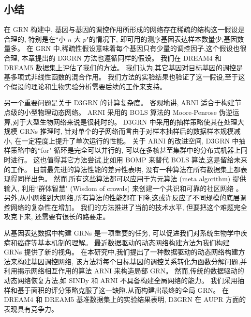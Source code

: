 \subsection{小结}

在 GRN 构建中, 基因与基因的调控作用所形成的网络存在稀疏的结构这一假设是合理的,
特别是在``小 $n$ 大 $p$"的情况下, 即可用的测序基因表达样本数量少,基因数量多。
在 GRN 中,稀疏性假设意味着每个基因只有少量的调控因子,这个假设也很合理,
本章提出的 D3GRN 方法也遵循同样的假设。
我们在 DREAM4 和 DREAM5 数据集上评估了我们的方法。
我们认为,其它基因对目标基因的调控是基多项式非线性函数的混合作用。
我们方法的实验结果也验证了这一假设,至于这个假设的理论和生物实验分析需要后续的工作来支持。

另一个重要问题是关于 D3GRN 的计算复杂度。
客观地讲, ARNI 适合于构建节点级的小型物理动态网络。
ARNI 采用的 BOLS 算法的 Moore-Penrose 伪逆运算,对于大型生物网络来说是很耗时的。
D3GRN 中采用的抽样策略使其在处理大规模 GRNs 推理时,
针对单个的子网络而言由于对样本抽样后的数据样本规模减小,
在一定程度上提升了单次运行的性能。
关于 ARNI 的改进空间, D3GRN 中抽样策略中的``for" 循环是完全可以并行的,
可以在多核甚至集群中的分布式机器上同时进行。
这也值得其它方法尝试,比如用 BOMP \cite{majumdar2009fast}来替代 BOLS 算法,这是留给未来的工作。
目前最先进的算法性能的差异性表明,
没有一种算法在所有数据集上都表现得同样出色。
然而,所有这些算法都可以应用于为元算法 (meta algorithm) 提供输入,
利用``群体智慧" (Wisdom of crowds) 来创建一个共识和可靠的社区网络 \cite{Marbach2012a,zheng2008gene}。
另外,从小网络到大网络,所有算法的性能都在下降,这或许反应了不同规模的底层调控网络的复杂性在增加。
我们的方法推进了当前的技术水平, 但要把这个难题完全攻克下来, 还需要有很长的路要走。

从基因表达数据中构建 GRNs 是一项重要的任务,
可以促进我们对系统生物学中疾病和癌症等基本机制的理解。
最近数据驱动的动态网络构建方法为我们构建 GRNs 提供了新的视角。
在本研究中,我们提出了一种数据驱动的动态网络构建方法来构建基因调控网络,
该方法将每个目标基因的调控关系转化为函数分解问题,并利用揭示网络相互作用的算法 ARNI 来构造局部 GRN。
然而,传统的数据驱动的动态网络恢复方法,如 SINDy 和 ARNI 不具备构建全局网络的能力。
我们采用抽样和基于面积的评分策略克服了这一缺陷,从而构建出最终的全局 GRN。
在 DREAM4 和 DREAM5 基准数据集上的实验结果表明, D3GRN 在 AUPR 方面的表现具有竞争力。